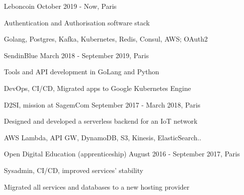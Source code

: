 


\begin{cventries}

\cventry
{} %
{Leboncoin} %
{October 2019 - Now, Paris} %
{} %
{ %
\begin{cvitems}
\item {Authentication and Authorisation software stack}
\item {Golang, Postgres, Kafka, Kubernetes, Redis, Consul, AWS; OAuth2}
\end{cvitems}
}


\cventry
{} %
{SendinBlue} %
{March 2018 - September 2019, Paris} %
{} %
{ %
\begin{cvitems}
\item {Tools and API development in GoLang and Python}
\item {DevOps, CI/CD, Migrated apps to Google Kubernetes Engine}
\end{cvitems}
}

\cventry
{} %
{D2SI, mission at SagemCom} %
{September 2017 - March 2018, Paris} %
{} %
{ %
\begin{cvitems}
\item {Designed and developed a serverless backend for an IoT network}
\item {AWS Lambda, API GW, DynamoDB, S3, Kinesis, ElasticSearch..}
\end{cvitems}
}

\cventry
{} %
{Open Digital Education (apprenticeship)} %
{August 2016 - September 2017, Paris} %
{} %
{ %
\begin{cvitems}
\item {Sysadmin, CI/CD, improved services' stability}
\item {Migrated all services and databases to a new hosting provider}
\end{cvitems}
}


\end{cventries}
